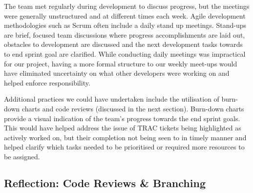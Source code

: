 \documentclass{l3proj}
\begin{document}
The team met regularly during development to discuss progress, but the meetings were generally unstructured and at different times each week. Agile development methodologies such as Scrum often include a daily stand up meetings. Stand-ups are brief, focused team discussions where progress accomplishments are laid out, obstacles to development are discussed and the next development tasks towards to end sprint goal are clarified. While conducting daily meetings was impractical for our project, having a more formal structure to our weekly meet-ups would have eliminated uncertainty on what other developers were working on and helped enforce responsibility. 

Additional practices we could have undertaken include the utilisation of burn-down charts and code reviews (discussed in the next section). Burn-down charts provide a visual indication of the team’s progress towards the end sprint goals. This would have helped address the issue of TRAC tickets being highlighted as actively worked on, but their completion not being seen to in timely manner and helped clarify which tasks needed to be prioritised or required more resources to be assigned. 


\subsection{Reflection: Code Reviews \& Branching}
\label{sec:codereviewbranch}




\end{document}
